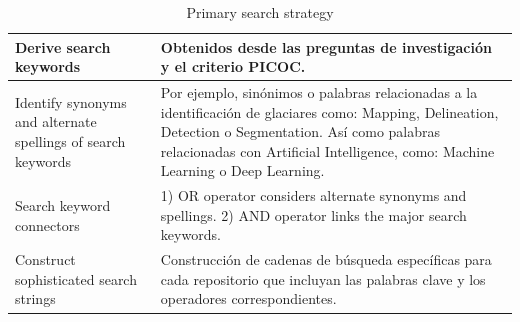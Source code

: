 \documentclass{article}
\begin{document}
\begin{table}[H]
    \centering
    \caption{Primary search strategy}
    \hspace{1cm}
    \label{tab:primary_search_strategy}
    \begin{tabularx}{\textwidth}{XX}
        \hline
        Derive search keywords                                       & Obtenidos desde las preguntas de investigación y el criterio PICOC.                                                                                                                                                                       \\ \hline
        Identify synonyms and alternate spellings of search keywords & Por ejemplo, sinónimos o palabras relacionadas a la identificación de glaciares como: Mapping, Delineation, Detection o Segmentation. Así como palabras relacionadas con Artificial Intelligence, como: Machine Learning o Deep Learning. \\ \hline
        Search keyword connectors                                    & 1) OR operator considers alternate synonyms and spellings. 2) AND operator links the major search keywords.                                                                                                                               \\ \hline
        Construct sophisticated search strings                       & Construcción de cadenas de búsqueda específicas para cada repositorio que incluyan las palabras clave y los operadores correspondientes.                                                                                                  \\ \hline
    \end{tabularx}
\end{table}
\end{document}
